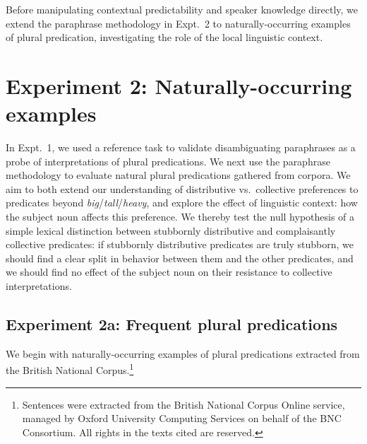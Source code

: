 \documentclass[preprint,12pt,authoryear,titlepage]{elsarticle}
\newcommand{\ndg}[1]{\textcolor{Green}{[ndg: #1]}}
\begin{document}
Before manipulating contextual predictability and speaker knowledge directly, we extend the paraphrase methodology in Expt.~2 to naturally-occurring examples of plural predication, investigating the role of the local linguistic context.


\section{Experiment 2: Naturally-occurring examples}

In Expt.~1, we used a reference task to validate disambiguating paraphrases as a probe of interpretations of plural predications. 
We next use the paraphrase methodology to evaluate natural plural predications gathered from corpora. We aim to both extend our understanding of distributive vs.~collective preferences to predicates beyond \emph{big}/\emph{tall}/\emph{heavy}, and explore the effect of linguistic context: how the subject noun affects this preference. We thereby test the null hypothesis of a simple lexical distinction between stubbornly distributive and complaisantly collective predicates: if stubbornly distributive predicates are truly stubborn, we should find a clear split in behavior between them and the other predicates, and we should find no effect of the subject noun on their resistance to collective interpretations.


\subsection{Experiment 2a: Frequent plural predications}

We begin with naturally-occurring examples of plural predications extracted from the British National Corpus.\footnote{Sentences were extracted from the British National Corpus Online service, managed by Oxford University Computing Services on behalf of the BNC Consortium. All rights in the texts cited are reserved.}
\end{document}
